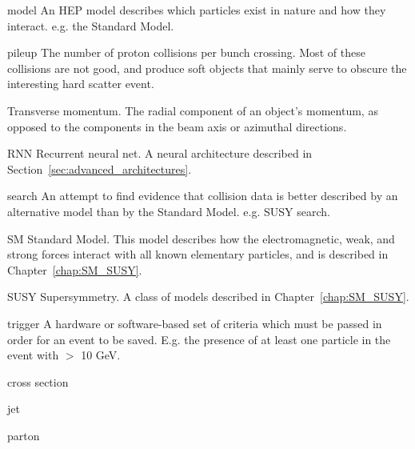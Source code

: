 \begin{symbollist*}
\item[model] An HEP model describes which particles exist in nature and how they interact. e.g. the Standard Model.
\item[pileup] The number of proton collisions per bunch crossing. Most of these collisions are not good, and produce soft objects that mainly serve to obscure the interesting hard scatter event.
\item[\pt] Transverse momentum. The radial component of an object's momentum, as opposed to the components in the beam axis or azimuthal directions.
\item[RNN] Recurrent neural net. A neural architecture described in Section~\ref{sec:advanced_architectures}.
\item[search] An attempt to find evidence that collision data is better described by an alternative model than by the Standard Model. e.g. SUSY search.
\item[SM] Standard Model. This model describes how the electromagnetic, weak, and strong forces interact with all known elementary particles, and is described in Chapter~\ref{chap:SM_SUSY}.
\item[SUSY] Supersymmetry. A class of models described in Chapter~\ref{chap:SM_SUSY}.
\item[trigger] A hardware or software-based set of criteria which must be passed in order for an event to be saved. E.g. the presence of at least one particle in the event with \pt $>$ 10 GeV.

\item[cross section]
\item[jet]
\item[parton]

\end{symbollist*}